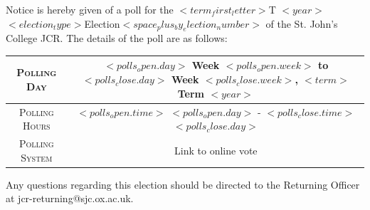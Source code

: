 \documentclass{header-footer}
\begin{document}
Notice is hereby given of a poll for the $<{ term_first_letter }>$T $<{ year }>$ $<{ election_type }>$Election$<{ space_plus_by_election_number }>$ of the St. John's College JCR.
The details of the poll are as follows:

\vspace{2ex}

\setlength{\tabcolsep}{0.5em}

\renewcommand{\arraystretch}{2}

\begin{tabular}{ |c|c|}
    \hline
    \textsc{Polling Day} & $<{ polls_open.day }>$ Week $<{ polls_open.week }>$ to $<{ polls_close.day }>$ Week $<{ polls_close.week }>$, $<{ term }>$ Term $<{ year }>$\\
    \hline
    \textsc{Polling Hours} & $<{ polls_open.time }>$ $<{ polls_open.day }>$ - $<{ polls_close.time }>$ $<{ polls_close.day }>$ \\
    \hline
    \textsc{Polling System} & Link to online vote \\
    \hline

\end{tabular}

\vspace{2ex}

Any questions regarding this election should be directed to the Returning Officer at jcr-returning@sjc.ox.ac.uk.
\end{document}
